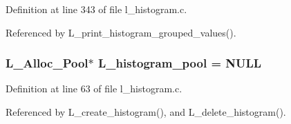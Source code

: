 Definition at line 343 of file l\_\-histogram.c.

Referenced by L\_\-print\_\-histogram\_\-grouped\_\-values().
\subsubsection{\setlength{\rightskip}{0pt plus 5cm}\bf{L\_\-Alloc\_\-Pool}$\ast$ \bf{L\_\-histogram\_\-pool} = NULL}\label{l__histogram_8c_92e771723b6a34740126beb49e8344f8}




Definition at line 63 of file l\_\-histogram.c.

Referenced by L\_\-create\_\-histogram(), and L\_\-delete\_\-histogram().